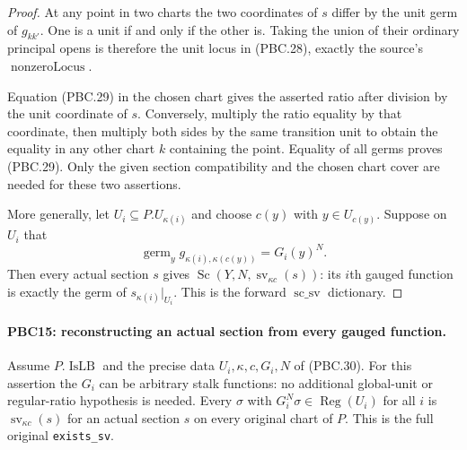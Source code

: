 \begin{proof}
At any point in two charts the two coordinates of $s$ differ
by the unit germ of $g_{kk'}$.  One is a unit if and only if
the other is.  Taking the union of their ordinary principal
opens is therefore the unit locus in (PBC.28), exactly the
source's $\operatorname{nonzeroLocus}$.

Equation (PBC.29) in the chosen chart gives the asserted ratio
after division by the unit coordinate of $s$.
Conversely, multiply the ratio equality by that coordinate,
then multiply both sides by the same transition unit to obtain
the equality in any other chart $k$ containing the point.
Equality of all germs proves (PBC.29).
Only the given section compatibility and the chosen chart cover
are needed for these two assertions.

More generally, let $U_i\subseteq P.U_{\kappa(i)}$ and choose
$c(y)$ with $y\in U_{c(y)}$.  Suppose on $U_i$ that
\[
 \operatorname{germ}_y g_{\kappa(i),\kappa(c(y))}
      =G_i(y)^N.
                                                        \tag{PBC.30}
\]
Then every actual section $s$ gives
$\operatorname{Sc}(Y,N,\operatorname{sv}_{\kappa c}(s))$:
its $i$th gauged function is exactly the germ of
$s_{\kappa(i)}|_{U_i}$.  This is the forward
$\operatorname{sc\_sv}$ dictionary.
\end{proof}

\paragraph{PBC15: reconstructing an actual section from every gauged function.}
\label{claim:PBC15}
Assume $P.\operatorname{IsLB}$ and the precise data
$U_i,\kappa,c,G_i,N$ of (PBC.30).  For this assertion the
$G_i$ can be arbitrary stalk functions: no additional
global-unit or regular-ratio hypothesis is needed.
Every $\sigma$ with
$G_i^N\sigma\in\operatorname{Reg}(U_i)$ for all $i$ is
$\operatorname{sv}_{\kappa c}(s)$ for an actual section
$s$ on every original chart of $P$.
This is the full original \texttt{exists\_sv}.

